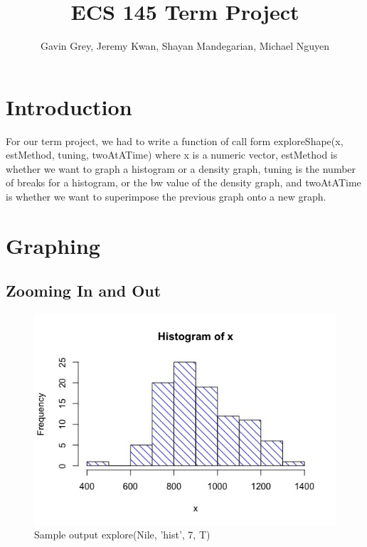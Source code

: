 \documentclass{article}
\title{ECS 145 Term Project}
\author{Gavin Grey, Jeremy Kwan, Shayan Mandegarian, Michael Nguyen}
\date{}
\begin{document}
\maketitle

\section{Introduction}
For our term project, we had to write a function of call form exploreShape(x, estMethod, tuning, twoAtATime) where x is a numeric vector, estMethod is whether we want to graph a histogram or a density graph, tuning is the number of breaks for a histogram, or the bw value of the density graph, and twoAtATime is whether we want to superimpose the previous graph onto a new graph.


\section{Graphing}

\subsection{Zooming In and Out}

\begin{figure}[h!]
\centering
\includegraphics[scale=0.5]{Nile, 7 histogram.jpeg}
\caption{Sample output explore(Nile, 'hist', 7, T)}
\label{fig:Nile density graph}
\end{figure}
\end{document}
